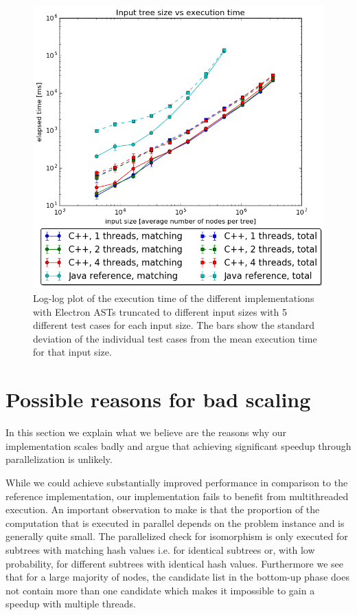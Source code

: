 \documentclass[letterpaper]{article}
\begin{document}
\begin{figure}
	\includegraphics[width=\linewidth]{measurements/electron/timePlot}
	\caption{Log-log plot of the execution time of the different implementations with Electron ASTs truncated to different input sizes with 5 different test cases for each input size. The bars show the standard deviation of the individual test cases from the mean execution time for that input size.}
	\label{fig:electron_time}
\end{figure}

\section{Possible reasons for bad scaling}

In this section we explain what we believe are the reasons why our implementation scales badly and argue that achieving significant speedup through parallelization is unlikely.

While we could achieve substantially improved performance in comparison to the reference implementation, our implementation fails to benefit from multithreaded execution.
An important observation to make is that the proportion of the computation that is executed in parallel depends on the problem instance and is generally quite small.
The parallelized check for isomorphism is only executed for subtrees with matching hash values i.e. for identical subtrees or, with low probability, for different subtrees with identical hash values.
Furthermore we see that for a large majority of nodes, the candidate list in the bottom-up phase does not contain more than one candidate which makes it impossible to gain a speedup with multiple threads.
\end{document}
